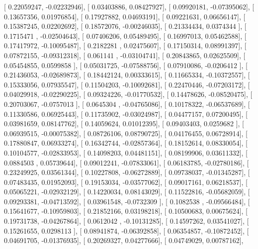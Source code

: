 \documentclass{article}
\begin{document}
       [ 0.22059247, -0.02232946],
       [ 0.03403886,  0.08427927],
       [ 0.09920181, -0.07395062],
       [ 0.13657356,  0.01976854],
       [ 0.17927882,  0.04693191],
       [ 0.09221631,  0.06656147],
       [ 0.15387245,  0.02202692],
       [ 0.18572076, -0.00246035],
       [ 0.21334434,  0.0374344 ],
       [ 0.1715471 , -0.02504643],
       [ 0.07406206,  0.05489495],
       [ 0.16997013,  0.05462588],
       [ 0.17417972, -0.10095487],
       [ 0.2182281 ,  0.02475607],
       [ 0.17150314,  0.08991397],
       [ 0.07872155, -0.09312318],
       [ 0.061141  , -0.03104741],
       [ 0.20843865,  0.02625509],
       [ 0.05454855,  0.0599858 ],
       [ 0.05031725, -0.07588756],
       [ 0.07910086, -0.0206412 ],
       [ 0.21436053, -0.02689873],
       [ 0.18442124,  0.00333615],
       [ 0.11665334, -0.10372557],
       [ 0.15333056,  0.07935547],
       [ 0.11504203, -0.10092681],
       [ 0.22470446, -0.07203172],
       [ 0.04029918, -0.02290225],
       [ 0.09324226, -0.01770532],
       [ 0.14478626, -0.08520475],
       [ 0.20703067, -0.0757013 ],
       [ 0.0645304 , -0.04765086],
       [ 0.10178322, -0.06537689],
       [ 0.11330586,  0.06925443],
       [ 0.11735902, -0.03024987],
       [ 0.04477157,  0.07200495],
       [ 0.03981659,  0.08147762],
       [ 0.14059624,  0.01012395],
       [ 0.09403403,  0.0259682 ],
       [ 0.06939515, -0.00075382],
       [ 0.08726106,  0.08790725],
       [ 0.04176455,  0.06728914],
       [ 0.17880847,  0.06933274],
       [ 0.16342744, -0.02857364],
       [ 0.18152614,  0.08330054],
       [ 0.10104577, -0.02833953],
       [ 0.14098203,  0.04481151],
       [ 0.08199906,  0.03611332],
       [ 0.0884503 ,  0.05739644],
       [ 0.09012241, -0.07833061],
       [ 0.06183785, -0.02780186],
       [ 0.23249925,  0.03561344],
       [ 0.10227808, -0.06272889],
       [ 0.09738037, -0.01345287],
       [ 0.07483435,  0.01952093],
       [ 0.19153034, -0.03577062],
       [ 0.09017161,  0.06218537],
       [ 0.05065221, -0.02932129],
       [ 0.14220034,  0.08143029],
       [ 0.11522816, -0.05682059],
       [ 0.09293381, -0.04713592],
       [ 0.03961548, -0.0732309 ],
       [ 0.1082538 , -0.09566484],
       [ 0.15641677, -0.10959803],
       [ 0.21852166,  0.03198218],
       [ 0.10500683,  0.00675624],
       [ 0.19731738, -0.04267864],
       [ 0.0612042 , -0.10131285],
       [ 0.14597262,  0.03541027],
       [ 0.15261655,  0.0298113 ],
       [ 0.08941874, -0.06392858],
       [ 0.06354857, -0.10872452],
       [ 0.04691705, -0.01376935],
       [ 0.20269327,  0.04277666],
       [ 0.04749029,  0.00787162],
\end{document}
